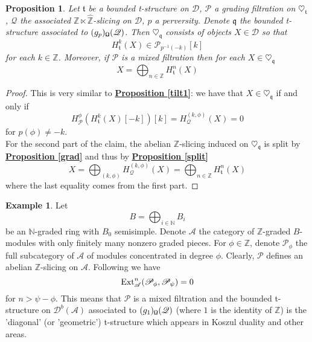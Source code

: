 \documentclass{article}
\newtheorem{prop}[thm]{Proposition}
\theoremstyle{definition}
\newtheorem{exmp}[thm]{Example}
\begin{document}
\begin{prop}
Let $\mathfrak{t}$ be a bounded t-structure on $\mathscr{D}$, $\mathscr{P}$ a grading filtration on $\heartsuit_{\mathfrak{t}}$, $\mathscr{Q}$ the associated $\mathbb{Z} \ltimes \hat{\mathbb{Z}}$-slicing on $\mathscr{D}$, $p$ a perversity. Denote $\mathfrak{q}$ the bounded t-structure associated to $(g_p)_{\textnormal{\Libra}}(\mathscr{Q})$. Then $\heartsuit_{\mathfrak{q}}$ consists of objects $X \in \mathscr{D}$ so that $$H_{\mathfrak{t}}^{k}(X) \in \mathscr{P}_{p^{-1}(-k)}[k]$$ 
for each $k \in \mathbb{Z}$. Moreover, if $\mathscr{P}$ is a mixed filtration then for each $X \in \heartsuit_{\mathfrak{q}}$ $$X=\bigoplus_{n \in \mathbb{Z}}H_{\mathfrak{t}}^{n}(X)$$ 
\end{prop}

\begin{proof}
This is very similar to \hyperref[tilt1]{\textbf{Proposition \ref*{tilt1}}}: we have that $X \in \heartsuit_{\mathfrak{q}}$ if and only if $$H_{\mathscr{P}}^{\phi}(H_{\mathfrak{t}}^k(X)[-k])[k]=H_{\mathscr{Q}}^{(k,\phi)}(X)=0$$ 
for $p(\phi) \not = -k$. \\
For the second part of the claim, the abelian $\mathbb{Z}$-slicing induced on $\heartsuit_{\mathfrak{q}}$ is split by \hyperref[grad]{\textbf{Proposition \ref*{grad}}} and thus by \hyperref[split]{\textbf{Proposition \ref*{split}}} $$X=\bigoplus_{(k,\phi)}H_{\mathscr{Q}}^{(k,\phi)}(X)=\bigoplus_{n \in \mathbb{Z}}H_{\mathfrak{t}}^{n}(X)$$
where the last equality comes from the first part. 
\end{proof}

\begin{exmp}
Let $$B=\bigoplus_{i\in \mathbb{N}}B_i$$ be an $\mathbb{N}$-graded ring with $B_0$ semisimple. Denote $\mathscr{A}$ the category of $\mathbb{Z}$-graded $B$-modules with only finitely many nonzero graded pieces. For $\phi \in \mathbb{Z}$, denote $\mathscr{P}_{\phi}$ the full subcategory of $\mathscr{A}$ of modules concentrated in degree $\phi$. Clearly, $\mathscr{P}$ defines an abelian $\mathbb{Z}$-slicing on $\mathscr{A}$. Following \cite{kos} we have $$\textnormal{Ext}_{\mathscr{A}}^n(\mathscr{P}_{\phi},\mathscr{P}_{\psi})=0$$
for $n>\psi - \phi$. This means that $\mathscr{P}$ is a mixed filtration and the bounded t-structure on $\mathscr{D}^b(\mathscr{A})$ associated to $(g_1)_{\textnormal{\Libra}}(\mathscr{Q})$ (where $1$ is the identity of $\mathbb{Z}$) is the 'diagonal' (or 'geometric') t-structure which appears in Koszul duality and other areas. 
\end{exmp}
\end{document}
